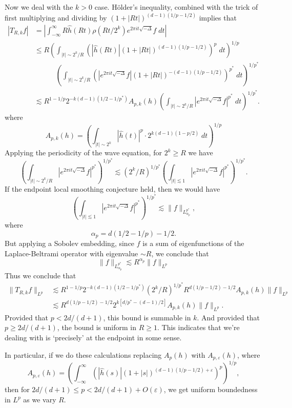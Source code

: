 Now we deal with the $k > 0$ case. H\"{o}lder's inequality, combined with the trick of first multiplying and dividing by $(1 + |Rt|)^{(d-1)(1/p - 1/2)}$ implies that
\begin{align*}
    |T_{R,k} f| &= \left| \int_{-\infty}^\infty R \widehat{h}(Rt) \rho(Rt / 2^k) e^{2 \pi i t \sqrt{-\Delta}} f\; dt \right|\\
    &\leq R \left( \int_{|t| \sim 2^k / R} \left( |\widehat{h}(Rt)| (1 + |Rt|)^{(d-1)(1/p - 1/2)} \right)^p\; dt \right)^{1/p}\\
    &\quad\quad\quad\left( \int_{|t| \sim 2^k / R} \left( |e^{2 \pi i t \sqrt{-\Delta}} f| (1 + |Rt|)^{-(d-1)(1/p - 1/2)} \right)^{p^*}\; dt \right)^{1/p^*}\\
    &\lesssim R^{1 - 1/p} 2^{-k(d-1)(1/2 - 1/p^*)} A_{p,k}(h) \left( \int_{|t| \sim 2^k / R} |e^{2 \pi i t \sqrt{-\Delta}} f|^{p^*}\; dt \right)^{1/p^*}.
\end{align*}
%
where
%
\[ A_{p,k}(h) = \left( \int_{|t| \sim 2^k} |\widehat{h}(t)|^p \cdot 2^{k(d-1)(1 - p/2)}\; dt \right)^{1/p} \]
%
Applying the periodicity of the wave equation, for $2^k \geq R$ we have
%
\[ \left( \int_{|t| \sim 2^k/R} |e^{2 \pi i t \sqrt{-\Delta}} f|^{p^*} \right)^{1/p^*} \lesssim (2^k/R)^{1/p^*} \left( \int_{|t| \lesssim 1} |e^{2 \pi i t \sqrt{-\Delta}} f|^{p^*} \right)^{1/p^*}. \]
%
If the endpoint local smoothing conjecture held, then we would have
%
\[ \left( \int_{|t| \lesssim 1} |e^{2 \pi i t \sqrt{-\Delta}} f|^{p^*} \right)^{1/p^*} \lesssim \| f \|_{L^{p^*}_{\alpha_p}}, \]
%
where
%
\[ \alpha_p = d(1/2 - 1/p) - 1/2. \]
%
But applying a Sobolev embedding, since $f$ is a sum of eigenfunctions of the Laplace-Beltrami operator with eigenvalue $\sim R$, we conclude that
%
\[ \| f \|_{L^{p^*}_{\alpha_p}} \lesssim R^{\alpha_p} \| f \|_{L^p} \]
%
Thus we conclude that
%
\begin{align*}
    \| T_{R,k} f \|_{L^p} &\lesssim R^{1 - 1/p} 2^{-k(d-1)(1/2 - 1/p^*)} (2^k/R)^{1/p^*} R^{d(1/p - 1/2) - 1/2} A_{p,k}(h) \| f \|_{L^p}\\
    &\lesssim R^{d(1/p - 1/2) - 1/2} 2^{k[d/p^* -(d-1)/2]} A_{p,k}(h) \| f \|_{L^p}.
\end{align*}
%
Provided that $p < 2d/(d+1)$, this bound is summable in $k$. And provided that $p \geq 2d/(d+1)$, the bound is uniform in $R \geq 1$. This indicates that we're dealing with is `precisely' at the endpoint in some sense.

In particular, if we do these calculations replacing $A_p(h)$ with $A_{p,\varepsilon}(h)$, where
%
\[ A_{p,\varepsilon}(h) = \left( \int_{-\infty}^\infty \left( |\widehat{h}(s)| (1 + |s|)^{(d-1)(1/p - 1/2) + \varepsilon} \right)^p \right)^{1/p}, \]
%
then for $2d/(d+1) \leq p < 2d/(d+1) + O(\varepsilon)$, we get uniform boundedness in $L^p$ as we vary $R$.

